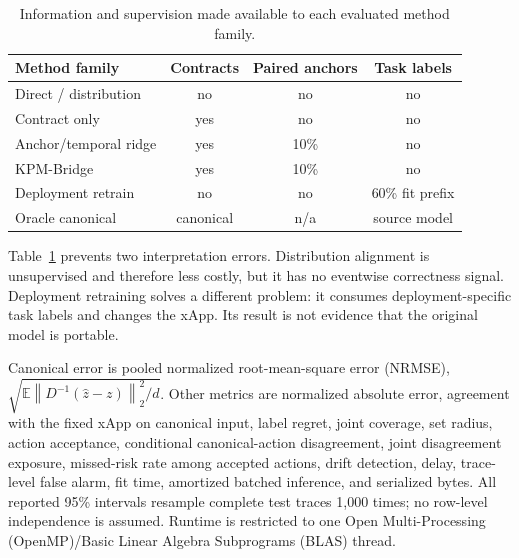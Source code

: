 \documentclass[10pt,journal,twoside]{IEEEtran}
\newcommand{\norm}[1]{\left\lVert #1\right\rVert}
\begin{document}
\begin{table}[t]
\caption{Information and supervision made available to each evaluated method family.}
\label{tab:fairness}
\centering
\scriptsize
\setlength{\tabcolsep}{3pt}
\begin{tabular}{lccc}
\toprule
Method family & Contracts & Paired anchors & Task labels \\
\midrule
Direct / distribution & no & no & no \\
Contract only & yes & no & no \\
Anchor/temporal ridge & yes & 10\% & no \\
KPM-Bridge & yes & 10\% & no \\
Deployment retrain & no & no & 60\% fit prefix \\
Oracle canonical & canonical & n/a & source model \\
\bottomrule
\end{tabular}
\end{table}

Table~\ref{tab:fairness} prevents two interpretation errors. Distribution alignment is unsupervised and therefore less costly, but it has no eventwise correctness signal. Deployment retraining solves a different problem: it consumes deployment-specific task labels and changes the xApp. Its result is not evidence that the original model is portable.

Canonical error is pooled normalized root-mean-square error (NRMSE), $\sqrt{\mathbb E\norm{D^{-1}(\hat z-z)}_2^2/d}$. Other metrics are normalized absolute error, agreement with the fixed xApp on canonical input, label regret, joint coverage, set radius, action acceptance, conditional canonical-action disagreement, joint disagreement exposure, missed-risk rate among accepted actions, drift detection, delay, trace-level false alarm, fit time, amortized batched inference, and serialized bytes. All reported 95\% intervals resample complete test traces 1,000 times; no row-level independence is assumed. Runtime is restricted to one Open Multi-Processing (OpenMP)/Basic Linear Algebra Subprograms (BLAS) thread.
\end{document}

